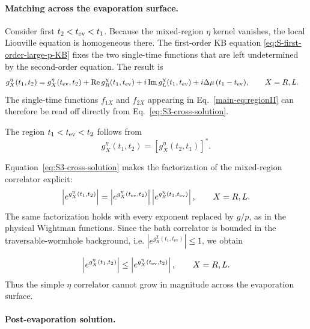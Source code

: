 \documentclass[11pt,a4paper]{article}
\begin{document}
\paragraph*{Matching across the evaporation surface.}

Consider first \(t_2<t_{\rm ev}<t_1\). Because the mixed-region
\(\eta\) kernel vanishes, the local Liouville equation is homogeneous there.
The first-order KB equation \eqref{eq:S-first-order-large-p-KB} fixes the two
single-time functions that are left undetermined by the second-order
equation. The result is
\begin{equation}
\begin{aligned}
g^\eta_X(t_1,t_2)
&=
g^\eta_X(t_{\rm ev},t_2)
+
\operatorname{Re}g^\chi_R(t_1,t_{\rm ev})
+i\operatorname{Im}g^\chi_L(t_1,t_{\rm ev})
+i\Delta\mu\,(t_1-t_{\rm ev}),
\qquad
X=R,L .
\end{aligned}
\label{eq:S3-cross-solution}
\end{equation}
The single-time functions \(f_{1X}\) and \(f_{2X}\) appearing in
Eq.~\eqref{main-eq:regionII} can therefore be read off directly from
Eq.~\eqref{eq:S3-cross-solution}.

The region \(t_1<t_{\rm ev}<t_2\) follows from
\begin{equation}
g^\eta_X(t_1,t_2)
=
\left[g^\eta_X(t_2,t_1)\right]^* .
\label{eq:S3-conjugation}
\end{equation}

Equation~\eqref{eq:S3-cross-solution} makes the factorization of the
mixed-region correlator explicit:
\begin{equation}
\left|e^{g^\eta_X(t_1,t_2)}\right|
=
\left|e^{g^\eta_X(t_{\rm ev},t_2)}\right|
\left|e^{g^\chi_R(t_1,t_{\rm ev})}\right|,
\qquad
X=R,L .
\label{eq:S3-cross-factorization}
\end{equation}
The same factorization holds with every exponent replaced by \(g/p\), as in
the physical Wightman functions. Since the bath correlator is bounded in the traversable-wormhole background, i.e. $ \left|e^{g^\chi_R(t_1,t_{\mathrm{ev}})}\right|
  \leq
  1$,
we obtain

\begin{equation}
  \left|e^{g^\eta_X(t_1,t_2)}\right|
  \leq
  \left|e^{g^\eta_X(t_{\rm ev},t_2)}\right|,
  \qquad
  X=R,L .
\label{eq:S3-cross-region-bound}
\end{equation}
Thus the simple \(\eta\) correlator cannot grow in magnitude across the
evaporation surface.

\paragraph*{Post-evaporation solution.}
\end{document}
